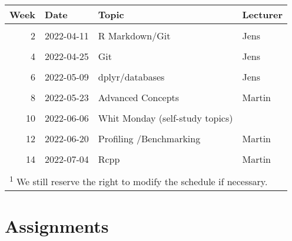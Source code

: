 \documentclass[]{article}
\begin{document}
\begin{table}[!h]
\centering
\begin{tabular}{rlll}
\toprule
Week & Date & Topic & Lecturer\\
\midrule
\cellcolor{gray!6}{1} & \cellcolor{gray!6}{2022-04-04} & \cellcolor{gray!6}{Introduction} & \cellcolor{gray!6}{Jens}\\
2 & 2022-04-11 & R Markdown/Git & Jens\\
\cellcolor{gray!6}{3} & \cellcolor{gray!6}{2022-04-18} & \cellcolor{gray!6}{Easter Monday (self-study topics)} & \cellcolor{gray!6}{}\\
4 & 2022-04-25 & Git & Jens\\
\cellcolor{gray!6}{5} & \cellcolor{gray!6}{2022-05-02} & \cellcolor{gray!6}{ggplot2} & \cellcolor{gray!6}{Jens}\\
6 & 2022-05-09 & dplyr/databases & Jens\\
\cellcolor{gray!6}{7} & \cellcolor{gray!6}{2022-05-16} & \cellcolor{gray!6}{Web Scraping} & \cellcolor{gray!6}{Jens}\\
8 & 2022-05-23 & Advanced Concepts & Martin\\
\cellcolor{gray!6}{9} & \cellcolor{gray!6}{2022-05-30} & \cellcolor{gray!6}{Functional} & \cellcolor{gray!6}{Martin}\\
10 & 2022-06-06 & Whit Monday  (self-study topics) & \\
\cellcolor{gray!6}{11} & \cellcolor{gray!6}{2022-06-13} & \cellcolor{gray!6}{OOP} & \cellcolor{gray!6}{Martin}\\
12 & 2022-06-20 & Profiling /Benchmarking & Martin\\
\cellcolor{gray!6}{13} & \cellcolor{gray!6}{2022-06-27} & \cellcolor{gray!6}{Improving Performance} & \cellcolor{gray!6}{Martin}\\
14 & 2022-07-04 & Rcpp & Martin\\
\cellcolor{gray!6}{15} & \cellcolor{gray!6}{2022-07-11} & \cellcolor{gray!6}{RcppAramdillo} & \cellcolor{gray!6}{Martin}\\
\bottomrule
\multicolumn{4}{l}{\textsuperscript{1} We still reserve the right to modify the schedule if necessary.}\\
\end{tabular}
\end{table}

\hypertarget{assignments}{%
\section{Assignments}\label{assignments}}
\end{document}
